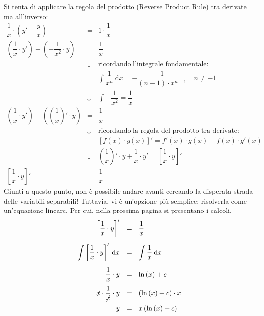 \documentclass[a4paper]{article}
\begin{document}
	\noindent
	Si tenta di applicare la regola del prodotto (Reverse Product Rule) tra derivate ma all'inverso:
	\begin{equation*}
		\begin{array}{rcl}
			\dfrac{1}{x} \cdot \left(y' - \dfrac{y}{x}\right) &=& 1 \cdot \dfrac{1}{x} \\ [1em]
			\left(\dfrac{1}{x} \cdot y'\right) + \left(-\dfrac{1}{x^{2}} \cdot y\right) &=& \dfrac{1}{x} \\ [1.5em]
			&\downarrow & \text{ricordando l'integrale fondamentale: } \\
			&			& \displaystyle\int \dfrac{1}{x^{n}} \:\mathrm{d}x = - \dfrac{1}{\left(n-1\right) \cdot x^{n-1}} \hspace{1em} n \ne -1 \\ [2em]
			&\downarrow& \displaystyle\int -\dfrac{1}{x^{2}} = \dfrac{1}{x} \\ [1em]
			\left(\dfrac{1}{x} \cdot y'\right) + \left(\left(\dfrac{1}{x}\right)' \cdot y\right) &=& \dfrac{1}{x} \\ [1.5em]
			&\downarrow & \text{ricordando la regola del prodotto tra derivate:} \\
			&			& \left[f\left(x\right) \cdot g\left(x\right)\right]' = f'\left(x\right) \cdot g\left(x\right) + f\left(x\right) \cdot g'\left(x\right) \\ [1.5em]
			&\downarrow & \left(\dfrac{1}{x}\right)' \cdot y + \dfrac{1}{x} \cdot y' = \left[\dfrac{1}{x} \cdot y\right]' \\ [1.5em]
			\left[\dfrac{1}{x} \cdot y\right]' &=& \dfrac{1}{x}
		\end{array}
	\end{equation*}
	Giunti a questo punto, non è possibile andare avanti cercando la disperata strada delle variabili separabili! Tuttavia, vi è un'opzione più semplice: risolverla come un'equazione lineare. Per cui, nella prossima pagina si presentano i calcoli.\newpage
	\begin{equation*}
		\begin{array}{rcl}
			\left[\dfrac{1}{x} \cdot y\right]' &=& \dfrac{1}{x} \\ [1.5em]
			\displaystyle\int \left[\dfrac{1}{x} \cdot y\right]' \:\mathrm{d}x &=& \displaystyle\int \dfrac{1}{x} \:\mathrm{d}x \\ [1.5em]
			\dfrac{1}{x} \cdot y &=& \ln\left(x\right) + c \\ [1em]
			\cancel{x} \cdot \dfrac{1}{\cancel{x}} \cdot y &=& \left(\ln\left(x\right) + c\right) \cdot x  \\ [1em]
			y &=& x\left(\ln\left(x\right) + c\right)
		\end{array}
	\end{equation*}
\end{document}
